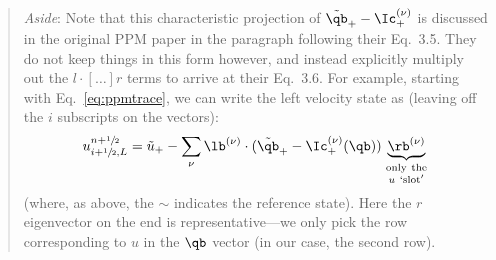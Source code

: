 \begin{quote}
\noindent\makebox[\linewidth]{\rule{0.9\textwidth}{1pt}}
{\em Aside}:
Note that this characteristic projection of $\tilde{\qb}_+ -
\Ic_+^{(\nu)}$ is discussed in the original PPM paper in the
paragraph following their Eq.~3.5.  They do not keep things in this form
however, and instead explicitly multiply out the $l\cdot [\ldots] r$
terms to arrive at their Eq.~3.6.  For example, starting with
Eq.~\ref{eq:ppmtrace},
we can write the left velocity state as (leaving off the $i$
subscripts on the vectors):
\begin{equation}
u_{i+\myhalf,L}^{n+\myhalf} =
  \tilde{u}_+ - \sum_\nu \lb^{(\nu)} \cdot
      ( \tilde{\qb}_+ -  \Ic_+^{(\nu)}(\qb) )
    \underbrace{\rb^{(\nu)}}_{\begin{smallmatrix}\mathrm{only~the}\\ u~\mathrm{`slot'} \end{smallmatrix}}
\end{equation}
(where, as above, the $\sim$ indicates the reference state).
Here the $r$ eigenvector on the end is representative---we only pick
the row corresponding to $u$ in the $\qb$ vector (in our case, the
second row).


\end{quote}
